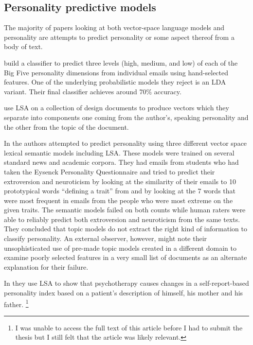 \subsection{Personality predictive models}

The majority of papers looking at both vector-space language models and 
personality are attempts to predict personality or some aspect thereof from a 
body of text.

 build a classifier to predict three levels
(high, medium, and low) of each of the Big Five personality dimensions from
individual emails using hand-selected features. One of the underlying 
probabilistic models they reject is an LDA variant. Their final classifier
achieves around 70\% accuracy.

 use LSA on a collection of design documents
to produce vectors which they separate into components one coming from 
the author's, speaking personality and the other from the topic of the document.

In  the authors attempted to predict personality
using three different vector space lexical semantic models including LSA. These
models were trained on several standard news and academic corpora. They
had emails from students who had taken the Eysenck Personality Questionnaire and
tried to predict their extroversion and neuroticism by looking at the similarity
of their emails to 10 prototypical words ``defining a trait'' from  and
by looking at the 7 words that were most frequent in emails from the people who
were most extreme on the given traits. The semantic models failed on both
counts while human raters were able to reliably predict both extroversion and
neuroticism from the same texts. They concluded that topic models do not
extract the right kind of information to classify personality. An external
observer, however, might note their unsophisticated use of pre-made topic
models created in a different domain to examine poorly selected features in 
a very small list of documents as an alternate explanation for their failure.

In  they use LSA to show that 
psychotherapy causes changes in a self-report-based personality index based 
on a patient's description of himself, his mother and his father.
\footnote{I was unable to access the full text of this article before I
had to submit the thesis but I still felt that the article was likely 
relevant.}

